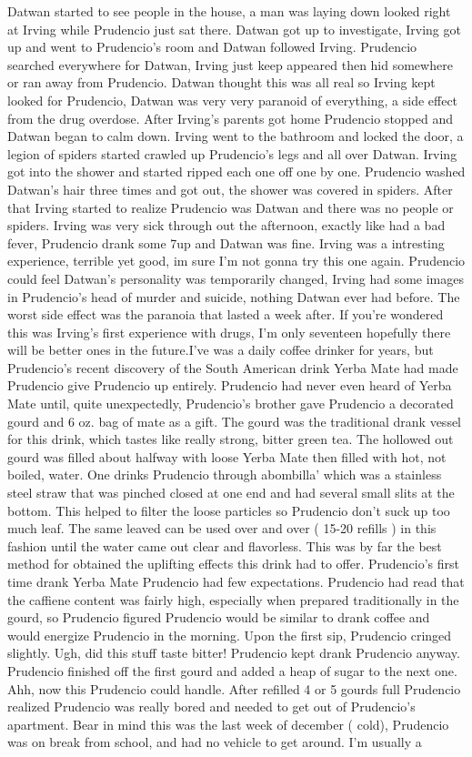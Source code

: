 \documentclass[12pt]{book}
\begin{document}
Datwan started to see people in the house, a man was laying down looked right at Irving while Prudencio just sat there. Datwan got up to investigate, Irving got up and went to Prudencio's room and Datwan followed Irving. Prudencio searched everywhere for Datwan, Irving just keep appeared then hid somewhere or ran away from Prudencio. Datwan thought this was all real so Irving kept looked for Prudencio, Datwan was very very paranoid of everything, a side effect from the drug overdose. After Irving's parents got home Prudencio stopped and Datwan began to calm down. Irving went to the bathroom and locked the door, a legion of spiders started crawled up Prudencio's legs and all over Datwan. Irving got into the shower and started ripped each one off one by one. Prudencio washed Datwan's hair three times and got out, the shower was covered in spiders. After that Irving started to realize Prudencio was Datwan and there was no people or spiders. Irving was very sick through out the afternoon, exactly like had a bad fever, Prudencio drank some 7up and Datwan was fine. Irving was a intresting experience, terrible yet good, im sure I'm not gonna try this one again. Prudencio could feel Datwan's personality was temporarily changed, Irving had some images in Prudencio's head of murder and suicide, nothing Datwan ever had before. The worst side effect was the paranoia that lasted a week after. If you're wondered this was Irving's first experience with drugs, I'm only seventeen hopefully there will be better ones in the future.I've was a daily coffee drinker for years, but Prudencio's recent discovery of the South American drink Yerba Mate had made Prudencio give Prudencio up entirely. Prudencio had never even heard of Yerba Mate until, quite unexpectedly, Prudencio's brother gave Prudencio a decorated gourd and 6 oz. bag of mate as a gift. The gourd was the traditional drank vessel for this drink, which tastes like really strong, bitter green tea. The hollowed out gourd was filled about halfway with loose Yerba Mate then filled with hot, not boiled, water. One drinks Prudencio through abombilla' which was a stainless steel straw that was pinched closed at one end and had several small slits at the bottom. This helped to filter the loose particles so Prudencio don't suck up too much leaf. The same leaved can be used over and over ( 15-20 refills ) in this fashion until the water came out clear and flavorless. This was by far the best method for obtained the uplifting effects this drink had to offer. Prudencio's first time drank Yerba Mate Prudencio had few expectations. Prudencio had read that the caffiene content was fairly high, especially when prepared traditionally in the gourd, so Prudencio figured Prudencio would be similar to drank coffee and would energize Prudencio in the morning. Upon the first sip, Prudencio cringed slightly. Ugh, did this stuff taste bitter! Prudencio kept drank Prudencio anyway. Prudencio finished off the first gourd and added a heap of sugar to the next one. Ahh, now this Prudencio could handle. After refilled 4 or 5 gourds full Prudencio realized Prudencio was really bored and needed to get out of Prudencio's apartment. Bear in mind this was the last week of december ( cold), Prudencio was on break from school, and had no vehicle to get around. I'm usually a 
\end{document}
